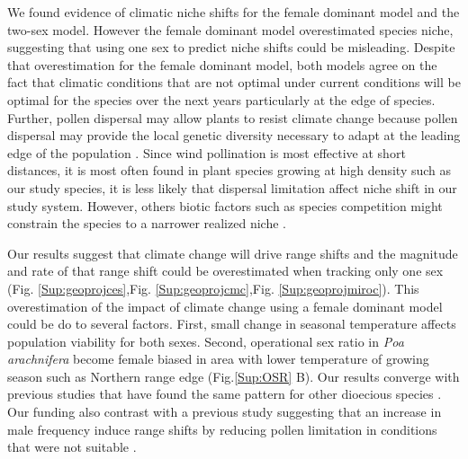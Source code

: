 \documentclass[12pt]{article}
\begin{document}
We found evidence of climatic niche shifts for the female dominant model and the two-sex model. 
However the female dominant model overestimated species niche, suggesting that using one sex to predict niche shifts could be misleading.
Despite that overestimation for the female dominant model, both models agree on the fact that climatic conditions that are not optimal under current conditions will be optimal for the species over the next years particularly at the edge of species. 
Further, pollen dispersal may allow plants to resist climate change because pollen dispersal may provide the local genetic diversity necessary to adapt at the leading edge of the population \citep{kremer2012long,corlett2013will,duputie2012genetic}.
Since wind pollination is most effective at short distances, it is most often found in plant species growing at high density such as our study species, it is less likely that dispersal limitation  affect niche shift in our study system. 
However, others biotic factors such as species competition might constrain the species to a narrower realized niche \citep{pulliam2000relationship,aguilee2016pollen}. 

Our results suggest that climate change will drive range shifts and the magnitude and rate of that range shift could be overestimated when tracking only one sex (Fig. \ref{Sup:geoprojces},Fig. \ref{Sup:geoprojcmc},Fig. \ref{Sup:geoprojmiroc}). 
This overestimation of the impact of climate change using a female dominant model could be do to several factors.
First, small change in seasonal temperature affects population viability for both sexes.
Second, operational sex ratio in \emph{Poa arachnifera} become female biased in area with lower temperature of growing season such as Northern range edge (Fig.\ref{Sup:OSR} B). 
Our results converge with previous studies that have found the same pattern for other dioecious species \citep{woldemelak2021effect,varga2020environmental}. 
Our funding also contrast with a previous study suggesting that an increase in male frequency induce range shifts by reducing pollen limitation in conditions that were not suitable \citep{petry2016sex}. 
\end{document}
